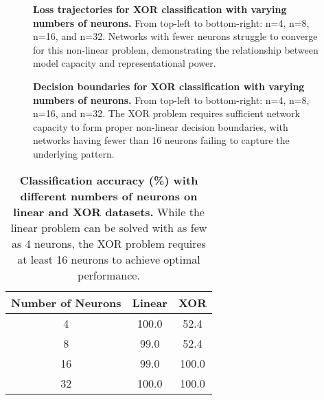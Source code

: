 \documentclass[twocolumn]{extarticle}
\begin{document}
\begin{figure}[H]
\caption{\textbf{Loss trajectories for XOR classification with varying numbers of neurons.} From top-left to bottom-right: n=4, n=8, n=16, and n=32. Networks with fewer neurons struggle to converge for this non-linear problem, demonstrating the relationship between model capacity and representational power.}
\label{fig:loss_xor_n}
\end{figure}

\begin{figure}[H]
\caption{\textbf{Decision boundaries for XOR classification with varying numbers of neurons.} From top-left to bottom-right: n=4, n=8, n=16, and n=32. The XOR problem requires sufficient network capacity to form proper non-linear decision boundaries, with networks having fewer than 16 neurons failing to capture the underlying pattern.}
\label{fig:res_xor_n}
\end{figure}

\begin{table}[t]
\centering
\caption{\textbf{Classification accuracy (\%) with different numbers of neurons on linear and XOR datasets.} While the linear problem can be solved with as few as 4 neurons, the XOR problem requires at least 16 neurons to achieve optimal performance.}
\label{tab:num}
\begin{tabular}{@{}ccc@{}}
\toprule
\textbf{Number of Neurons} & \textbf{Linear} & \textbf{XOR} \\ \midrule
4          & 100.0            & 52.4         \\
8           & 99.0           & 52.4        \\
16         & 99.0            & 100.0         \\
32        & 100.0            & 100.0         \\ \bottomrule
\end{tabular}
\end{table}
\end{document}
